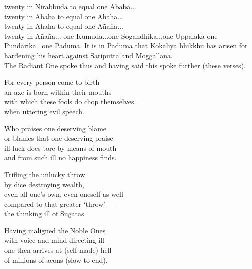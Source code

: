 twenty in Nirabbuda to equal one Ababa...\\

twenty in Ababa to equal one Ahaha...\\

twenty in Ahaha to equal one A\~na\~na...\\

twenty in A\~na\~na... one Kumuda...one Sogandhika...one Uppalaka one Pund\=arika...one Paduma. It is in Paduma that Kok\=aliya bhikkhu has arisen for hardening his heart against S\=ariputta and Moggall\=ana.\\

 The Radiant One spoke thus and having said this spoke further (these verses).\\

\begin{MyDescription}{}
For every person come to birth\\
an axe is born within their mouths\\
with which these fools do chop themselves\\
when uttering evil speech.
\end{MyDescription} 

\begin{MyDescription}{}
Who praises one deserving blame\\
or blames that one deserving praise\\
ill-luck does tore by means of mouth\\
and from such ill no happiness finds.
\end{MyDescription} 



\begin{MyDescription}{}
Trifling the unlucky throw\\
by dice destroying wealth,\\
even all one's own, even oneself as well\\
compared to that greater `throw' —\\
the thinking ill of Sugatas.
\end{MyDescription} 


\begin{MyDescription}{}
Having maligned the Noble Ones\\
with voice and mind directing ill\\
one then arrives at (self-made) hell\\
of millions of aeons (slow to end).
\end{MyDescription} 

